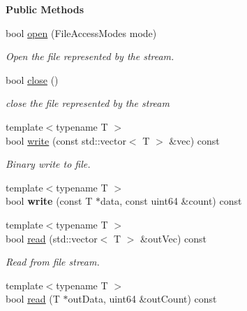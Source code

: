 \begin{Indent}\textbf{ Public Methods}\par
\begin{DoxyCompactItemize}
\item 
bool \mbox{\hyperlink{classrev_1_1_file_stream_a22ec65604c81039f7cb6564fe08f7cee}{open}} (File\+Access\+Modes mode)
\begin{DoxyCompactList}\small\item\em Open the file represented by the stream. \end{DoxyCompactList}\item 
bool \mbox{\hyperlink{classrev_1_1_file_stream_a699b309e32c3aa9a0e1842b4fe7c810f}{close}} ()
\begin{DoxyCompactList}\small\item\em close the file represented by the stream \end{DoxyCompactList}\item 
{\footnotesize template$<$typename T $>$ }\\bool \mbox{\hyperlink{classrev_1_1_file_stream_a288b87bc6513a66186f7e1d66ad01e40}{write}} (const std\+::vector$<$ T $>$ \&vec) const
\begin{DoxyCompactList}\small\item\em Binary write to file. \end{DoxyCompactList}\item 
\mbox{\label{classrev_1_1_file_stream_a66a9dea6e1e71e4caef8753c2e1b5b82}} 
{\footnotesize template$<$typename T $>$ }\\bool {\bfseries write} (const T $\ast$data, const uint64 \&count) const
\item 
\mbox{\label{classrev_1_1_file_stream_a69ab95af89ea8c717e0c058079b9a9f9}} 
{\footnotesize template$<$typename T $>$ }\\bool \mbox{\hyperlink{classrev_1_1_file_stream_a69ab95af89ea8c717e0c058079b9a9f9}{read}} (std\+::vector$<$ T $>$ \&out\+Vec) const
\begin{DoxyCompactList}\small\item\em Read from file stream. \end{DoxyCompactList}\item 
{\footnotesize template$<$typename T $>$ }\\bool \mbox{\hyperlink{classrev_1_1_file_stream_a3de51c1f2aebcb45600b5bd9eb5e48ed}{read}} (T $\ast$out\+Data, uint64 \&out\+Count) const

\end{DoxyCompactItemize}
\end{Indent}

